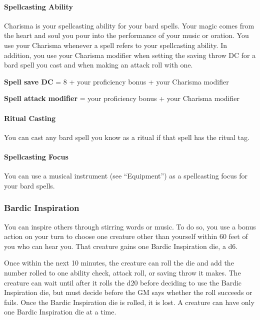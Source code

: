 \documentclass[
]{article}
\begin{document}
\hypertarget{spellcasting-ability}{%
\paragraph{Spellcasting Ability}\label{spellcasting-ability}}

Charisma is your spellcasting ability for your bard spells. Your magic
comes from the heart and soul you pour into the performance of your
music or oration. You use your Charisma whenever a spell refers to your
spellcasting ability. In addition, you use your Charisma modifier when
setting the saving throw DC for a bard spell you cast and when making an
attack roll with one.

\textbf{Spell save DC} = 8 + your proficiency bonus + your Charisma
modifier

\textbf{Spell attack modifier} = your proficiency bonus + your Charisma
modifier

\hypertarget{ritual-casting}{%
\paragraph{Ritual Casting}\label{ritual-casting}}

You can cast any bard spell you know as a ritual if that spell has the
ritual tag.

\hypertarget{spellcasting-focus}{%
\paragraph{Spellcasting Focus}\label{spellcasting-focus}}

You can use a musical instrument (see ``Equipment'') as a spellcasting
focus for your bard spells.

\hypertarget{bardic-inspiration}{%
\subsubsection{Bardic Inspiration}\label{bardic-inspiration}}

You can inspire others through stirring words or music. To do so, you
use a bonus action on your turn to choose one creature other than
yourself within 60 feet of you who can hear you. That creature gains one
Bardic Inspiration die, a d6.

Once within the next 10 minutes, the creature can roll the die and add
the number rolled to one ability check, attack roll, or saving throw it
makes. The creature can wait until after it rolls the d20 before
deciding to use the Bardic Inspiration die, but must decide before the
GM says whether the roll succeeds or fails. Once the Bardic Inspiration
die is rolled, it is lost. A creature can have only one Bardic
Inspiration die at a time.
\end{document}
